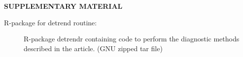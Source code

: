 \documentclass[aoas]{imsart}
\begin{document}
\bigskip
\begin{center}
	{\large\bf SUPPLEMENTARY MATERIAL}
\end{center}

\begin{description}
	
	\item[R-package for detrend routine:] R-package detrendr containing code to perform the diagnostic methods described in the article. (GNU zipped tar file)
	
\end{description}




\end{document}
